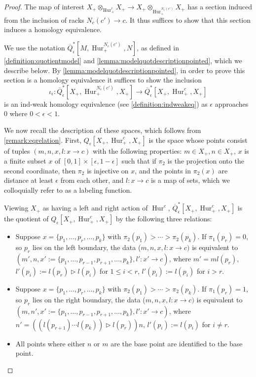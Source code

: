 \documentclass[12 pt]{amsart}
\theoremstyle{plain}
\theoremstyle{definition}
\theoremstyle{remark}
\numberwithin{equation}{section}
\DeclareMathOperator\Hur{Hur}
\begin{document}
\begin{proof}
	The map of interest $X_+\otimes_{\Hur^{c}_+}X_+ \to
	X_+\otimes_{\Hur^{N_c(c')}_+}X_+ $ has a section induced from the inclusion
	of racks $N_c(c') \to c$. It thus suffices to show that this section induces
	a homology equivalence.
	
	We use the notation $\overline{Q}^*_\epsilon[M,\Hur_+^{N_c(c')},N]$, as	defined in \autoref{definition:quotientmodel} and \autoref{lemma:modelquotdescriptionpointed}, which we describe below.
	By \autoref{lemma:modelquotdescriptionpointed}, in order to prove this section is a
	homology equivalence it suffices to show the inclusion
	$$\iota_{\epsilon}:\overline{Q}^*_\epsilon[X_+,\Hur_+^{N_c(c')},X_+] \to
	\overline{Q}^*_\epsilon[X_+,\Hur_+^{c},X_+]$$ is an ind-weak homology equivalence (see \autoref{definition:indweakeq}) as $\epsilon$ approaches $0$ where $0<\epsilon<1$.
	
	We now recall the description of these spaces, which follows from \autoref{remark:eqrelation}.
	First, ${Q}_{\epsilon}[X_+,\Hur^{c}_+,X_+]$ is the space whose points
	consist of tuples
	$(m,n,x,l:x \to c)$ with the following properties:
	$m \in X_+, n \in X_+$, $x$ is a finite 
	subset $x$ of
	$[0,1]\times [\epsilon,1-\epsilon]$ such that if $\pi_2$ is the projection onto the
	second coordinate, then $\pi_2$ is injective on $x$, and the points in
	$\pi_2(x)$ are distance at least $\epsilon$ from each other,
	and $l:x \to c$ is a map of sets, which we colloquially refer to as a labeling function.
	
	Viewing $X_+$ as having a left and right action of $\Hur^c$, 	
	$\overline{Q}^*_{\epsilon}[X_+,\Hur^{c}_+,X_+]$
	is the quotient of 
${Q}_{\epsilon}[X_+,\Hur^{c}_+,X_+]$
	by the following three relations:
		\begin{itemize}
			\item[$(i)$] 			Suppose $x = \{p_1, \ldots, p_r,\ldots, p_k\}$ with $\pi_2(p_1) >
			\cdots > \pi_2(p_k)$. If $\pi_1(p_r) = 0$, so $p_r$ lies
			on the left boundary, the data ($m,n,x,l:x \to c)$ is
			equivalent to $(m', n, x' := \{p_1, \ldots, p_{r-1},  p_{r+1},
			\ldots, p_k\}, l': x'\to c)$, where $m' = ml(p_r)$,
			$l'(p_i) := l(p_r)\triangleright l(p_i)$ for $1
			\leq i < r$, $l'(p_i) := l(p_i)$ for $i > r$.
			
			
			\item[$(ii)$] Suppose $x = \{p_1, \ldots, p_r,\ldots, p_k\}$ with
			$\pi_2(p_1) >
			\cdots > \pi_2(p_k)$. If $\pi_1(p_r) = 1$, so $p_r$ lies
			on the right boundary, the data ($m,n,x,l:x \to c)$ is
			equivalent to $(m, n', x' := \{p_1, \ldots, p_{r-1},  p_{r+1},
			\ldots, p_k\}, l': x'\to c)$, where $n' = ((l(p_{r+1})\cdots l(p_{k}))\triangleright l(p_r))n$, $l'(p_i) := l(p_i)$ for $i \neq r$.
			\item[$(iii)$] All points where either $n$ or $m$ are the base point are identified to the base point.
		\end{itemize}
		

\end{proof}
\end{document}
